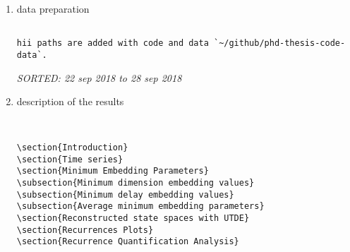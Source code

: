 \documentclass[10pt]{article}
\begin{document}
\begin{enumerate}


\item data preparation

\begin{verbatim}

hii paths are added with code and data `~/github/phd-thesis-code-data`.

\end{verbatim}
\textit{
SORTED: 
22 sep 2018 to 28 sep 2018
}
\\

\item description of the results

\begin{verbatim}


\section{Introduction}
\section{Time series}
\section{Minimum Embedding Parameters}
\subsection{Minimum dimension embedding values}
\subsection{Minimum delay embedding values}
\subsection{Average minimum embedding parameters}
\section{Reconstructed state spaces with UTDE}
\section{Recurrences Plots}
\section{Recurrence Quantification Analysis}

\end{verbatim}
\end{enumerate}
\end{document}
